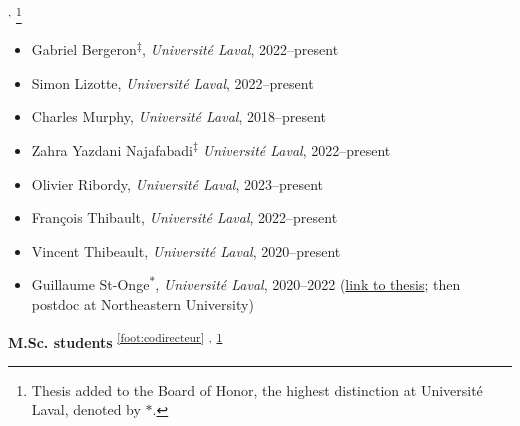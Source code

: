 \documentclass[11pt]{article}
\begin{document}
\textsuperscript{,}%
\footnote{\label{foot:tableau}Thesis added to the Board of Honor, the highest distinction at Université Laval, denoted by $\ast$.}
%
\begin{itemize}
  \item Gabriel Bergeron\textsuperscript{$\ddagger$}, \textit{Universit\'e Laval}, 2022--present
  \item Simon Lizotte, \textit{Universit\'e Laval}, 2022--present
  \item Charles Murphy, \textit{Universit\'e Laval}, 2018--present%
  \item Zahra Yazdani Najafabadi\textsuperscript{$\ddagger$} \textit{Université Laval}, 2022--present
  \item Olivier Ribordy, \textit{Universit\'e Laval}, 2023--present
  \item Fran\c{c}ois Thibault, \textit{Universit\'e Laval}, 2022--present
  \item Vincent Thibeault, \textit{Université Laval}, 2020--present
  \item Guillaume St-Onge\textsuperscript{$\ast$}, \textit{Université Laval}, 2020--2022 {\small(\href{http://antoineallard.github.io/files/theses/StOnge.2022.PhD.pdf}{link to thesis}; then postdoc at Northeastern University)}
\end{itemize}
%
%
%
\pagebreak
\textbf{M.Sc. students}%
%
\textsuperscript{\ref{foot:codirecteur}}%
\textsuperscript{,}%
\textsuperscript{\ref{foot:tableau}}%
%
\end{document}
